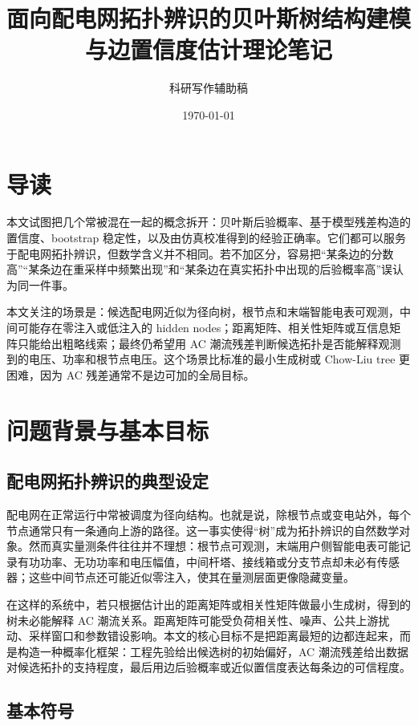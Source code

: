 \documentclass[UTF8,12pt,openany]{ctexrep}
\title{面向配电网拓扑辨识的贝叶斯树结构建模与边置信度估计理论笔记}
\author{科研写作辅助稿}
\date{\today}
\numberwithin{equation}{chapter}
\theoremstyle{definition}
\theoremstyle{plain}
\begin{document}
\maketitle
\tableofcontents

\chapter*{导读}

本文试图把几个常被混在一起的概念拆开：贝叶斯后验概率、基于模型残差构造的置信度、bootstrap 稳定性，以及由仿真校准得到的经验正确率。它们都可以服务于配电网拓扑辨识，但数学含义并不相同。若不加区分，容易把“某条边的分数高”“某条边在重采样中频繁出现”和“某条边在真实拓扑中出现的后验概率高”误认为同一件事。

本文关注的场景是：候选配电网近似为径向树，根节点和末端智能电表可观测，中间可能存在零注入或低注入的 hidden nodes；距离矩阵、相关性矩阵或互信息矩阵只能给出粗略线索；最终仍希望用 AC 潮流残差判断候选拓扑是否能解释观测到的电压、功率和根节点电压。这个场景比标准的最小生成树或 Chow-Liu tree 更困难，因为 AC 残差通常不是边可加的全局目标。

\chapter{问题背景与基本目标}

\section{配电网拓扑辨识的典型设定}

配电网在正常运行中常被调度为径向结构。也就是说，除根节点或变电站外，每个节点通常只有一条通向上游的路径。这一事实使得“树”成为拓扑辨识的自然数学对象。然而真实量测条件往往并不理想：根节点可观测，末端用户侧智能电表可能记录有功功率、无功功率和电压幅值，中间杆塔、接线箱或分支节点却未必有传感器；这些中间节点还可能近似零注入，使其在量测层面更像隐藏变量。

在这样的系统中，若只根据估计出的距离矩阵或相关性矩阵做最小生成树，得到的树未必能解释 AC 潮流关系。距离矩阵可能受负荷相关性、噪声、公共上游扰动、采样窗口和参数错设影响。本文的核心目标不是把距离最短的边都连起来，而是构造一种概率化框架：工程先验给出候选树的初始偏好，AC 潮流残差给出数据对候选拓扑的支持程度，最后用边后验概率或近似置信度表达每条边的可信程度。

\section{基本符号}
\end{document}
